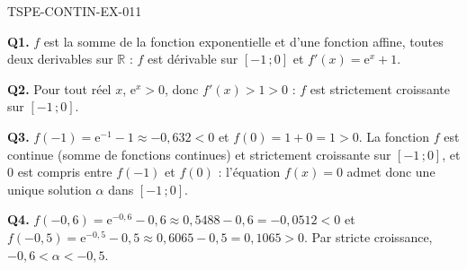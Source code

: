 \begin{corrige}{TSPE-CONTIN-EX-011}

\textbf{Q1.} $f$ est la somme de la fonction exponentielle et d'une fonction affine, toutes deux derivables sur $\mathbb{R}$ : $f$ est dérivable sur $[-1\,;0]$ et $f'(x) = \mathrm{e}^{x} + 1$.

\textbf{Q2.} Pour tout réel $x$, $\mathrm{e}^{x} > 0$, donc $f'(x) > 1 > 0$ : $f$ est strictement croissante sur $[-1\,;0]$.

\textbf{Q3.} $f(-1) = \mathrm{e}^{-1} - 1 \approx -0{,}632 < 0$ et $f(0) = 1 + 0 = 1 > 0$. La fonction $f$ est continue (somme de fonctions continues) et strictement croissante sur $[-1\,;0]$, et $0$ est compris entre $f(-1)$ et $f(0)$ : l'équation $f(x) = 0$ admet donc une unique solution $\alpha$ dans $[-1\,;0]$.

\textbf{Q4.} $f(-0{,}6) = \mathrm{e}^{-0{,}6} - 0{,}6 \approx 0{,}5488 - 0{,}6 = -0{,}0512 < 0$ et $f(-0{,}5) = \mathrm{e}^{-0{,}5} - 0{,}5 \approx 0{,}6065 - 0{,}5 = 0{,}1065 > 0$. Par stricte croissance, $-0{,}6 < \alpha < -0{,}5$.
\end{corrige}

